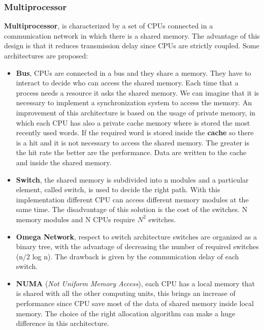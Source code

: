 \subsubsection{Multiprocessor}
\textbf{Multiprocessor}, is characterized by a set of CPUs connected in a communication network in which there is a shared memory. The advantage of this design is that it reduces transmission delay since CPUs are strictly coupled. Some architectures are proposed:
\begin{itemize}
    \item \textbf{Bus}, CPUs are connected in a bus and they share a memory. They have to interact to decide who can access the shared memory. Each time that a process needs a resource it asks the shared memory. We can imagine that it is necessary to implement a synchronization system to access the memory.
     An improvement of this architecture is based on the usage of private memory, in which each CPU has also a private cache memory where is stored the most recently used words. If the required word is stored inside the \textbf{cache} so there is a hit and it is not necessary to access the shared memory. The greater is the hit rate the better are the performance. Data are written to the cache and inside the shared memory.
    \item \textbf{Switch}, the shared memory is subdivided into n modules and a particular element, called switch, is used to decide the right path. With this implementation different CPU can access different memory modules at the same time. The disadvantage of this solution is the cost of the switches. N memory modules and N CPUs require $N^2$ switches.
    \item \textbf{Omega Network}, respect to switch architecture switches are organized as a binary tree, with the advantage of decreasing the number of required switches (n/2 log n). The drawback is given by the communication delay of each switch.
    \item \textbf{NUMA} (\textit{Not Uniform Memory Access}), each CPU has a local memory that is shared with all the other computing units, this brings an increase of performance since CPU save most of the data of shared memory inside local memory. The choice of the right allocation algorithm can make a huge difference in this architecture. 
\end{itemize}


